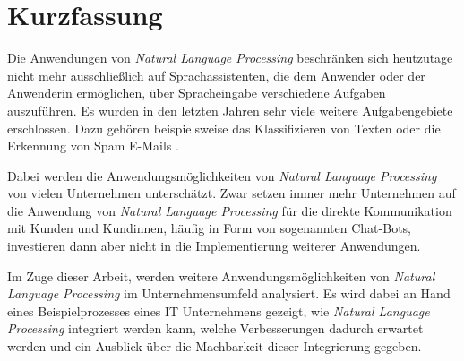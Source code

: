 \chapter{Kurzfassung}
Die Anwendungen von \textit{Natural Language Processing} beschränken sich heutzutage nicht mehr ausschließlich auf Sprachassistenten, die dem Anwender oder der Anwenderin ermöglichen, über Spracheingabe verschiedene Aufgaben auszuführen. Es wurden in den letzten Jahren sehr viele weitere Aufgabengebiete erschlossen. Dazu gehören beispielsweise das Klassifizieren von Texten oder die Erkennung von Spam E-Mails \cite{DannReconstructing}\cite{Rohit2014}.

Dabei werden die Anwendungsmöglichkeiten von \textit{Natural Language Processing} von vielen Unternehmen unterschätzt. Zwar setzen immer mehr Unternehmen auf die Anwendung von \textit{Natural Language Processing} für die direkte Kommunikation mit Kunden und Kundinnen, häufig in Form von sogenannten Chat-Bots, investieren dann aber nicht in die Implementierung weiterer Anwendungen. 

Im Zuge dieser Arbeit, werden weitere Anwendungsmöglichkeiten von \textit{Natural Language Processing} im Unternehmensumfeld analysiert. Es wird dabei an Hand eines Beispielprozesses eines IT Unternehmens gezeigt, wie \textit{Natural Language Processing} integriert werden kann, welche Verbesserungen dadurch erwartet werden und ein Ausblick über die Machbarkeit dieser Integrierung gegeben.


